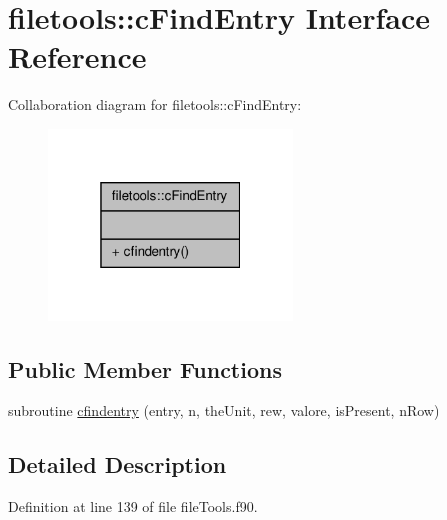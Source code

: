 \hypertarget{interfacefiletools_1_1c_find_entry}{\section{filetools\-:\-:c\-Find\-Entry Interface Reference}
\label{interfacefiletools_1_1c_find_entry}
}


Collaboration diagram for filetools\-:\-:c\-Find\-Entry\-:\nopagebreak
\begin{figure}[H]
\begin{center}
\leavevmode
\includegraphics[width=184pt]{interfacefiletools_1_1c_find_entry__coll__graph}
\end{center}
\end{figure}
\subsection*{Public Member Functions}
\begin{DoxyCompactItemize}
\item 
subroutine \hyperlink{interfacefiletools_1_1c_find_entry_af8f083dc5d82069ac9c02e3ae98e30bf}{cfindentry} (entry, n, the\-Unit, rew, valore, is\-Present, n\-Row)
\end{DoxyCompactItemize}


\subsection{Detailed Description}


Definition at line 139 of file file\-Tools.\-f90.




